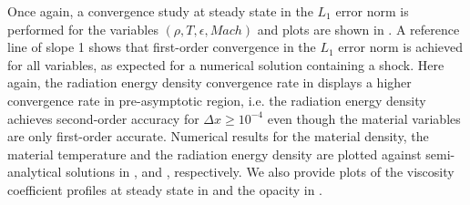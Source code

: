 \documentclass[times,doublespace]{fldauth}%
\begin{document}
Once again, a convergence study at steady state in the $L_1$ error norm is performed for the variables $(\rho, T, \epsilon, Mach)$ and plots are shown in  . A reference line of slope 1 shows that first-order convergence in the $L_1$ error norm is achieved for all variables, as expected for a numerical solution containing a shock. Here again, the radiation energy density convergence rate in  displays a higher convergence rate in pre-asymptotic region, i.e. the radiation energy density achieves second-order accuracy for $\Delta x \geq 10^{-4}$ even though the material variables are only first-order accurate. 
Numerical results for the material density, the material temperature and the radiation energy density are plotted against semi-analytical solutions in ,  and , respectively. We also provide plots of the viscosity coefficient profiles at steady state in  and the opacity in .
%
\end{document}
